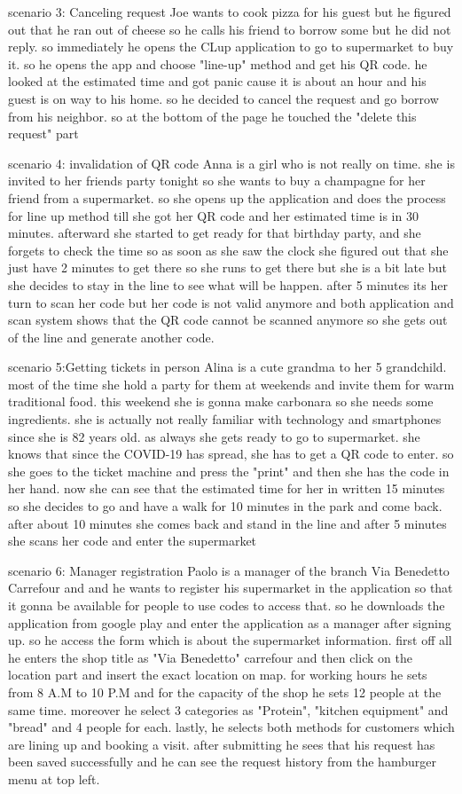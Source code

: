 scenario 3: Canceling request
Joe wants to cook pizza for his guest but he figured out that he ran out of cheese so he calls his friend to borrow some but he did not reply. so immediately he opens the CLup application to go to supermarket to buy it. so he opens the app and choose "line-up" method and get his QR code. he looked at the estimated time and got panic cause it is about an hour and his guest is on way to his home. so he decided to cancel the request and go borrow from his neighbor. so at the bottom of the page he touched the "delete this request" part

scenario 4: invalidation of QR code 
Anna is a girl who is not really on time. she is invited to her friends party tonight so she wants to buy a champagne for her friend from a supermarket. so she opens up the application and does the process for line up method till she got her QR code and her estimated time is in 30 minutes. afterward she started to get ready for that birthday party, and she forgets to check the time so as soon as she saw the clock she figured out that she just have 2 minutes to get there so she runs to get there but she is a bit late but she decides to stay in the line to see what will be happen. after 5 minutes its her turn to scan her code but her code is not valid anymore and both application and scan system shows that the QR code cannot be scanned anymore so she gets out of the line and generate another code.

scenario 5:Getting tickets in person
Alina is a cute grandma to her 5 grandchild. most of the time she hold a party for them at weekends and invite them for warm traditional food. this weekend she is gonna make carbonara so she needs some ingredients. she is actually not really familiar with technology and smartphones since she is 82 years old. as always she gets ready to go to supermarket. she knows that since the COVID-19 has spread, she has to get a QR code to enter. so she goes to the ticket machine and press the "print" and then she has the code in her hand. now she can see that the estimated time for her in written 15 minutes so she decides to go and have a walk for 10 minutes in the park and come back. after about 10 minutes she comes back and stand in the line and after 5 minutes she scans her code and enter the supermarket

scenario 6: Manager registration
Paolo is a manager of the branch Via Benedetto Carrefour and and he wants to register his supermarket in the application so that it gonna be available for people to use codes to access that.  so he downloads the application from google play and enter the application as a manager after signing up. so he access the form which is about the supermarket information. first off all he enters the shop title as "Via Benedetto" carrefour and then click on the location part and insert the exact location on map. for working hours he sets from 8 A.M to 10 P.M and for the capacity of the shop he sets 12 people at the same time. moreover he select 3 categories as "Protein", "kitchen equipment" and "bread" and 4 people for each. lastly, he selects both methods for customers which are lining up and booking a visit. after submitting he sees that his request has been saved successfully and he can see the request history from the hamburger menu at top left.